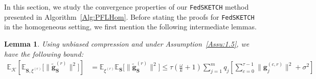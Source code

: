 \documentclass[twoside]{article}
\newtheorem{lemma}{Lemma}
\begin{document}
In this section, we study the convergence properties of our  \texttt{FedSKETCH} method presented in Algorithm~\ref{Alg:PFLHom}. Before stating the proofs for \texttt{FedSKETCH} in the homogeneous setting, we first mention the following intermediate lemmas. 


\begin{lemma}\label{lemma:tasbih1-iid}
Using unbiased compression and under Assumption~\ref{Assu:1.5}, we have the following bound: 
\begin{align}
\mathbb{E}_{\mathcal{K}}\left[\mathbb{E}_{{\mathbf{S},\xi^{(r)}}}\Big[\|\tilde{\mathbf{g}}_{\mathbf{S}}^{(r)}\|^2\Big]\right]&=\mathbb{E}_{{\xi}^{(r)}}\mathbb{E}_{\mathbf{S}}\Big[\|\tilde{\mathbf{g}}_\mathbf{S}^{(r)}\|^2\Big]\leq \tau(\frac{\omega}{k}+1)\sum_{j=1}^mq_j\left[\sum_{c=0}^{\tau-1}\|\mathbf{g}_j^{(c,r)}\|^2+\sigma^2\right] \label{eq:lemma1}
\end{align}
\end{lemma}
\end{document}
